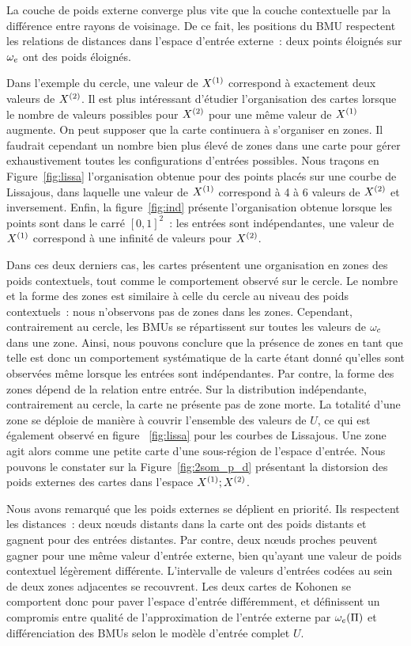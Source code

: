 \documentclass[../main]{subfiles}
\begin{document}
La couche de poids externe converge plus vite que la couche contextuelle par la différence entre rayons de voisinage. De ce fait, les positions du BMU respectent les relations de distances dans l'espace d'entrée externe~: deux points éloignés sur $\omega_e$ ont des poids éloignés.

Dans l'exemple du cercle, une valeur de $X^{({1})}$ correspond à exactement deux valeurs de $X^{({2})}$. Il est plus intéressant d'étudier l'organisation des cartes lorsque le nombre de valeurs possibles pour $X^{({2})}$ pour une même valeur de $X^{({1})}$ augmente. On peut supposer que la carte continuera à s'organiser en zones. 
Il faudrait cependant un nombre bien plus élevé de zones dans une carte pour gérer exhaustivement toutes les configurations d'entrées possibles.
Nous traçons en Figure~\ref{fig:lissa} l'organisation obtenue pour des points placés sur une courbe de Lissajous, dans laquelle une valeur de $X^{({1})}$ correspond à 4 à 6 valeurs de $X^{({2})}$ et inversement. 
Enfin, la figure~\ref{fig:ind} présente l'organisation obtenue lorsque les points sont dans le carré $[0,1]^2$~: les entrées sont indépendantes, une valeur de $X^{({1})}$ correspond à une infinité de valeurs pour $X^{({2})}$. 

Dans ces deux derniers cas, les cartes présentent une organisation en zones des poids contextuels, tout comme le comportement observé sur le cercle. Le nombre et la forme des zones est similaire à celle du cercle au niveau des poids contextuels~: nous n'observons pas de zones dans les zones. Cependant, contrairement au cercle, les BMUs se répartissent sur toutes les valeurs de $\omega_c$ dans une zone.
Ainsi, nous pouvons conclure que la présence de zones en tant que telle est donc un comportement systématique de la carte étant donné qu'elles sont observées même lorsque les entrées sont indépendantes. Par contre, la forme des zones dépend de la relation entre entrée.
Sur la distribution indépendante, contrairement au cercle, la carte ne présente pas de zone morte. La totalité d'une zone se déploie de manière à couvrir l'ensemble des valeurs de $U$, ce qui est également observé en figure ~\ref{fig:lissa} pour les courbes de Lissajous.
Une zone agit alors comme une petite carte d'une sous-région de l'espace d'entrée. Nous pouvons le constater sur la Figure~\ref{fig:2som_p_d} présentant la distorsion des poids externes des cartes dans l'espace $X^{({1})}; X^{({2})}$.


Nous avons remarqué que les poids externes se déplient en priorité. Ils respectent les distances~: deux n\oe{}uds distants dans la carte ont des poids distants et gagnent pour des entrées distantes.  
Par contre, deux n\oe{}uds proches peuvent gagner pour une même valeur d'entrée externe, bien qu'ayant une valeur de poids contextuel légèrement différente.
L'intervalle de valeurs d'entrées codées au sein de deux zones adjacentes se recouvrent.
Les deux cartes de Kohonen se comportent donc pour paver l'espace d'entrée différemment, et définissent un compromis entre qualité de l'approximation de l'entrée externe par $\omega_e(\Pi)$ et différenciation des BMUs selon le modèle d'entrée complet $U$.
\end{document}
